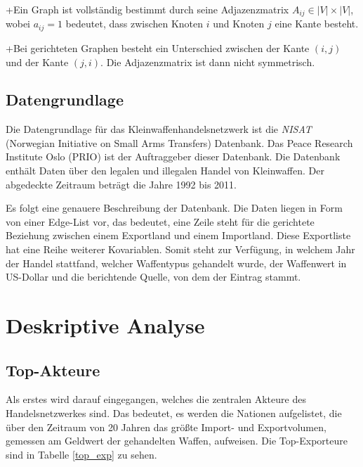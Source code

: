 \documentclass[a4paper,ngerman,oneside,titlepage,bibliography=totoc,11pt]{scrreprt}
\begin{document}
+Ein Graph ist vollständig bestimmt durch seine Adjazenzmatrix $A_{ij} \in |V| \times |V|$, wobei $a_{ij} = 1$ bedeutet, dass zwischen Knoten $i$ und Knoten $j$ eine Kante besteht.

+Bei gerichteten Graphen besteht ein Unterschied zwischen der Kante $(i,j)$ und der Kante $(j,i)$. Die Adjazenzmatrix ist dann nicht symmetrisch.


\section{Datengrundlage}

Die Datengrundlage für das Kleinwaffenhandelsnetzwerk ist die \emph{NISAT} (Norwegian Initiative on Small Arms Transfers) Datenbank. Das Peace Research Institute Oslo (PRIO) ist der Auftraggeber dieser Datenbank. Die Datenbank enthält Daten über den legalen und illegalen Handel von Kleinwaffen. Der abgedeckte Zeitraum beträgt die Jahre 1992 bis 2011.

Es folgt eine genauere Beschreibung der Datenbank. Die Daten liegen in Form von einer Edge-List vor, das bedeutet, eine Zeile steht für die gerichtete Beziehung zwischen einem Exportland und einem Importland. Diese Exportliste hat eine Reihe weiterer Kovariablen. Somit steht zur Verfügung, in welchem Jahr der Handel stattfand, welcher Waffentypus gehandelt wurde, der Waffenwert in US-Dollar und die berichtende Quelle, von dem der Eintrag stammt.

\chapter{Deskriptive Analyse}

\section{Top-Akteure}

Als erstes wird darauf eingegangen, welches die zentralen Akteure des Handelsnetzwerkes sind. Das bedeutet, es werden die Nationen aufgelistet, die über den Zeitraum von 20 Jahren das größte Import- und Exportvolumen, gemessen am Geldwert der gehandelten Waffen, aufweisen. Die Top-Exporteure sind in Tabelle \ref{top_exp} zu sehen.
\end{document}
